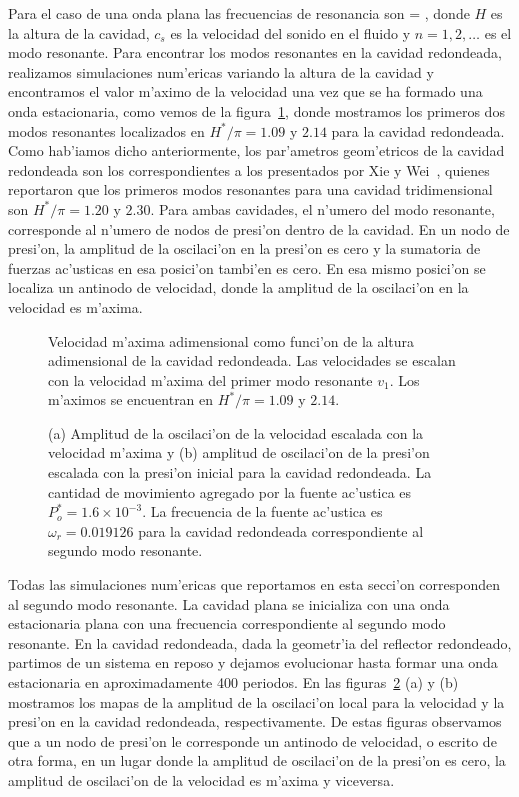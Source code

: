Para el caso de una onda plana las frecuencias de resonancia son
\BE
\omega = ,
\EE
donde $H$ es la altura de la cavidad, $c_s$ es la velocidad del sonido en el fluido  
y $n=1,2,\ldots$ es el modo resonante. Para encontrar los modos resonantes 
en la cavidad redondeada, realizamos simulaciones num'ericas variando la altura de la cavidad 
y encontramos el valor m'aximo de la velocidad una vez que se ha formado una onda estacionaria, 
como vemos  de la figura~\ref{fig:resonancia}, donde mostramos los primeros dos  modos resonantes
localizados en $H^\ast/\pi =1.09$ y $2.14$ para la cavidad redondeada.
Como hab'iamos dicho anteriormente, los par'ametros geom'etricos de la cavidad redondeada son los correspondientes 
a los presentados por Xie y Wei~\cite{xie01}, quienes reportaron que los primeros modos resonantes para 
una cavidad tridimensional son  $H^\ast/\pi=1.20$  y $2.30$. 
Para ambas cavidades, el n'umero del modo resonante, corresponde al n'umero de nodos de presi'on dentro de la 
cavidad. En un nodo de presi'on, la amplitud de la oscilaci'on  en la presi'on es cero y la sumatoria de fuerzas ac'usticas
en esa posici'on tambi'en es cero. En esa mismo posici'on se localiza un antinodo de velocidad, donde la amplitud
de la oscilaci'on en la velocidad es m'axima.

\begin{figure} 

\caption{\label{fig:resonancia}
Velocidad m'axima adimensional como funci'on de la altura adimensional de la cavidad redondeada.  Las 
velocidades se escalan con la velocidad m'axima del primer modo resonante $v_1$. Los m'aximos se encuentran
en  $H^\ast/\pi =1.09$ y $2.14$.}
\end{figure}
\begin{figure} 
\hskip -3cm

\hskip -3.1cm

\caption{\label{fig:nodos-presion-velocidad}
(a) Amplitud de la oscilaci'on de la velocidad escalada con la velocidad m'axima y (b) amplitud de oscilaci'on 
de la presi'on escalada con la presi'on inicial para la cavidad redondeada. 
La cantidad de movimiento agregado por la fuente ac'ustica es 
$P_o^\ast = 1.6 \times 10^{-3}$. La  frecuencia  de la fuente ac'ustica es $\omega_r = 0.019126$ para la cavidad
redondeada  correspondiente al segundo modo resonante.
}
\end{figure}


Todas las simulaciones num'ericas que reportamos en esta secci'on corresponden al segundo modo resonante. 
La cavidad plana se inicializa con una onda estacionaria plana con una frecuencia correspondiente al 
segundo modo resonante. En la cavidad redondeada, dada la geometr'ia del reflector redondeado, 
partimos de un sistema en reposo y dejamos evolucionar hasta 
formar una onda estacionaria en  aproximadamente 400 periodos.
En las figuras~\ref{fig:nodos-presion-velocidad} (a) y (b) mostramos los mapas de la amplitud de la oscilaci'on 
local para la velocidad y la presi'on en la cavidad redondeada, respectivamente. 
De estas figuras observamos que a un nodo de presi'on le corresponde un antinodo de velocidad, o escrito
de otra forma, en un lugar donde la amplitud de oscilaci'on de la presi'on es cero, la amplitud de oscilaci'on 
de la velocidad es m'axima y viceversa.

